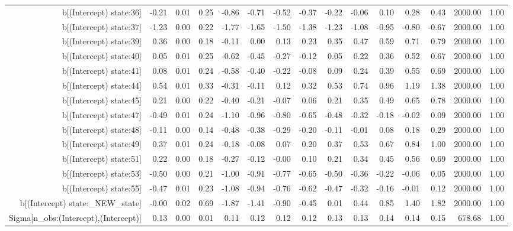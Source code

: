 \begin{table}[ht]
\begin{tabular}{rrrrrrrrrrrrrrr}
  b[(Intercept) state:36] & -0.21 & 0.01 & 0.25 & -0.86 & -0.71 & -0.52 & -0.37 & -0.22 & -0.06 & 0.10 & 0.28 & 0.43 & 2000.00 & 1.00 \\ 
  b[(Intercept) state:37] & -1.23 & 0.00 & 0.22 & -1.77 & -1.65 & -1.50 & -1.38 & -1.23 & -1.08 & -0.95 & -0.80 & -0.67 & 2000.00 & 1.00 \\ 
  b[(Intercept) state:39] & 0.36 & 0.00 & 0.18 & -0.11 & 0.00 & 0.13 & 0.23 & 0.35 & 0.47 & 0.59 & 0.71 & 0.79 & 2000.00 & 1.00 \\ 
  b[(Intercept) state:40] & 0.05 & 0.01 & 0.25 & -0.62 & -0.45 & -0.27 & -0.12 & 0.05 & 0.22 & 0.36 & 0.52 & 0.67 & 2000.00 & 1.00 \\ 
  b[(Intercept) state:41] & 0.08 & 0.01 & 0.24 & -0.58 & -0.40 & -0.22 & -0.08 & 0.09 & 0.24 & 0.39 & 0.55 & 0.69 & 2000.00 & 1.00 \\ 
  b[(Intercept) state:44] & 0.54 & 0.01 & 0.33 & -0.31 & -0.11 & 0.12 & 0.32 & 0.53 & 0.74 & 0.96 & 1.19 & 1.38 & 2000.00 & 1.00 \\ 
  b[(Intercept) state:45] & 0.21 & 0.00 & 0.22 & -0.40 & -0.21 & -0.07 & 0.06 & 0.21 & 0.35 & 0.49 & 0.65 & 0.78 & 2000.00 & 1.00 \\ 
  b[(Intercept) state:47] & -0.49 & 0.01 & 0.24 & -1.10 & -0.96 & -0.80 & -0.65 & -0.48 & -0.32 & -0.18 & -0.02 & 0.09 & 2000.00 & 1.00 \\ 
  b[(Intercept) state:48] & -0.11 & 0.00 & 0.14 & -0.48 & -0.38 & -0.29 & -0.20 & -0.11 & -0.01 & 0.08 & 0.18 & 0.29 & 2000.00 & 1.00 \\ 
  b[(Intercept) state:49] & 0.37 & 0.01 & 0.24 & -0.18 & -0.08 & 0.07 & 0.20 & 0.37 & 0.53 & 0.67 & 0.84 & 1.00 & 2000.00 & 1.00 \\ 
  b[(Intercept) state:51] & 0.22 & 0.00 & 0.18 & -0.27 & -0.12 & -0.00 & 0.10 & 0.21 & 0.34 & 0.45 & 0.56 & 0.69 & 2000.00 & 1.00 \\ 
  b[(Intercept) state:53] & -0.50 & 0.00 & 0.21 & -1.00 & -0.91 & -0.77 & -0.65 & -0.50 & -0.36 & -0.22 & -0.06 & 0.05 & 2000.00 & 1.00 \\ 
  b[(Intercept) state:55] & -0.47 & 0.01 & 0.23 & -1.08 & -0.94 & -0.76 & -0.62 & -0.47 & -0.32 & -0.16 & -0.01 & 0.12 & 2000.00 & 1.00 \\ 
  b[(Intercept) state:\_NEW\_state] & -0.00 & 0.02 & 0.69 & -1.87 & -1.41 & -0.90 & -0.45 & 0.01 & 0.44 & 0.85 & 1.40 & 1.82 & 2000.00 & 1.00 \\ 
  Sigma[n\_obs:(Intercept),(Intercept)] & 0.13 & 0.00 & 0.01 & 0.11 & 0.12 & 0.12 & 0.12 & 0.13 & 0.13 & 0.14 & 0.14 & 0.15 & 678.68 & 1.00 \\ 

\end{tabular}
\end{table}
